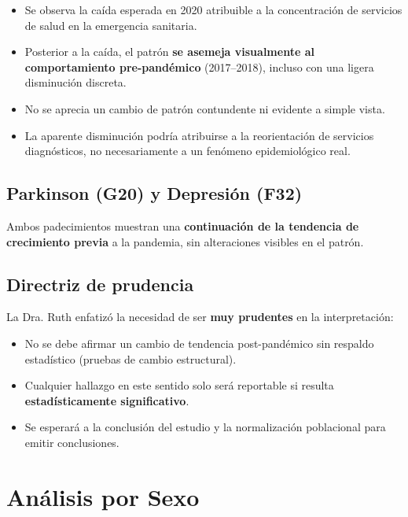 \documentclass[11pt, a4paper]{article}
\begin{document}
\begin{itemize}[leftmargin=1.5cm]
    \item Se observa la caída esperada en 2020 atribuible a la concentración de servicios de salud en la emergencia sanitaria.
    \item Posterior a la caída, el patrón \textbf{se asemeja visualmente al comportamiento pre-pandémico} (2017--2018), incluso con una ligera disminución discreta.
    \item No se aprecia un cambio de patrón contundente ni evidente a simple vista.
    \item La aparente disminución podría atribuirse a la reorientación de servicios diagnósticos, no necesariamente a un fenómeno epidemiológico real.
\end{itemize}

\subsection{Parkinson (G20) y Depresión (F32)}

Ambos padecimientos muestran una \textbf{continuación de la tendencia de crecimiento previa} a la pandemia, sin alteraciones visibles en el patrón.

\subsection{Directriz de prudencia}

La Dra. Ruth enfatizó la necesidad de ser \textbf{muy prudentes} en la interpretación:

\begin{itemize}[leftmargin=1.5cm]
    \item No se debe afirmar un cambio de tendencia post-pandémico sin respaldo estadístico (pruebas de cambio estructural).
    \item Cualquier hallazgo en este sentido solo será reportable si resulta \textbf{estadísticamente significativo}.
    \item Se esperará a la conclusión del estudio y la normalización poblacional para emitir conclusiones.
\end{itemize}

\vspace{0.5cm}

\section{Análisis por Sexo}
\end{document}
